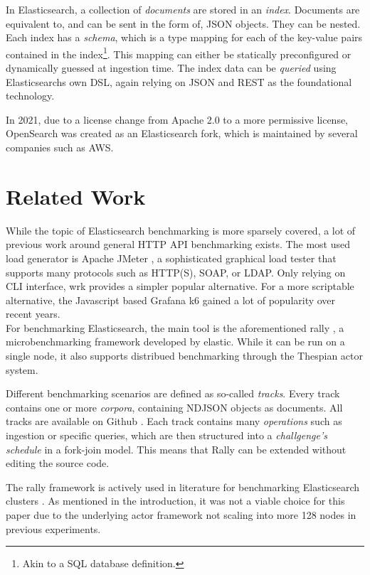 In Elasticsearch, a collection of \emph{documents} are stored in an \emph{index}. Documents are equivalent to, and can be sent in the form of, \ac{JSON} objects. They can be nested. Each index has a \emph{schema}, which is a type mapping for each of the key-value pairs contained in the index\footnote{Akin to a SQL database definition.}. This mapping can either be statically preconfigured or dynamically guessed at ingestion time. The index data can be \emph{queried} using Elasticsearchs own \ac{DSL}, again relying on \ac{JSON} and REST as the foundational technology.

In 2021, due to a license change from Apache 2.0 to a more permissive license, OpenSearch was created as an Elasticsearch fork, which is maintained by several companies such as AWS.

\section{Related Work}
While the topic of Elasticsearch benchmarking is more sparsely covered, a lot of previous work around general HTTP API benchmarking exists. The most used load generator is Apache JMeter \cite{jmeter}, a sophisticated graphical load tester that supports many protocols such as HTTP(S), SOAP, or LDAP. Only relying on \ac{CLI} interface, wrk \cite{wrk} provides a simpler popular alternative. For a more scriptable alternative, the Javascript based Grafana k6 \cite{k6} gained a lot of popularity over recent years.\\

For benchmarking Elasticsearch, the main tool is the aforementioned rally \cite{rally}, a microbenchmarking framework developed by elastic. While it can be run on a single node, it also supports distribued benchmarking through the Thespian actor system.

Different benchmarking scenarios are defined as so-called \emph{tracks}. Every track contains one or more \emph{corpora}, containing \ac{NDJSON} objects as documents. All tracks are available on Github \cite{rallytracks}. Each track contains many \emph{operations} such as ingestion or specific queries, which are then structured into a \emph{challgenge's} \emph{schedule} in a fork-join model. This means that Rally can be extended without editing the source code.

The rally framework is actively used in literature for benchmarking Elasticsearch clusters \cite{rallyusecase1} \cite{rallyusecase2} \cite{rallyusecase3}. As mentioned in the introduction, it was not a viable choice for this paper due to the underlying actor framework not scaling into more 128 nodes in previous experiments.

